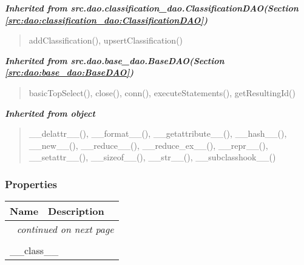 \large{\textbf{\textit{Inherited from src.dao.classification\_dao.ClassificationDAO\textit{(Section \ref{src:dao:classification_dao:ClassificationDAO})}}}}

\begin{quote}
addClassification(), upsertClassification()
\end{quote}

\large{\textbf{\textit{Inherited from src.dao.base\_dao.BaseDAO\textit{(Section \ref{src:dao:base_dao:BaseDAO})}}}}

\begin{quote}
basicTopSelect(), close(), conn(), executeStatements(), getResultingId()
\end{quote}

\large{\textbf{\textit{Inherited from object}}}

\begin{quote}
\_\_delattr\_\_(), \_\_format\_\_(), \_\_getattribute\_\_(), \_\_hash\_\_(), \_\_new\_\_(), \_\_reduce\_\_(), \_\_reduce\_ex\_\_(), \_\_repr\_\_(), \_\_setattr\_\_(), \_\_sizeof\_\_(), \_\_str\_\_(), \_\_subclasshook\_\_()
\end{quote}


  \subsubsection{Properties}

    \vspace{-1cm}
\hspace{\varindent}\begin{longtable}{|p{\varnamewidth}|p{\vardescrwidth}|l}
\cline{1-2}
\cline{1-2} \centering \textbf{Name} & \centering \textbf{Description}& \\
\cline{1-2}
\endhead\cline{1-2}\multicolumn{3}{r}{\small\textit{continued on next page}}\\\endfoot\cline{1-2}
\endlastfoot\multicolumn{2}{|l|}{\textit{Inherited from object}}\\
\multicolumn{2}{|p{\varwidth}|}{\raggedright \_\_class\_\_}\\
\cline{1-2}
\end{longtable}

